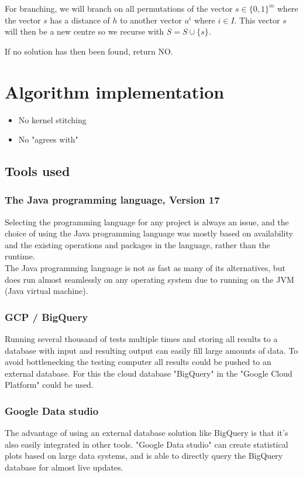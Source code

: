 \documentclass[a4paper]{article}
\begin{document}
For branching, we will branch on all permutations of the vector $s \in \{0,1\}^m$ where the vector $s$ has a
distance of $h$ to another vector $a^i$ where $i \in I$. This vector $s$ will then be a new centre so we recurse
with $S = S \cup \{s\}$.

If no solution has then been found, return NO.



%
%
\newpage

\section{Algorithm implementation}
\begin{itemize}
    \item No kernel stitching
    \item No "agrees with"
\end{itemize}
\subsection{Tools used}
\subsubsection{The Java programming language, Version 17}
Selecting the programming language for any project is always an issue, and the choice of using
the Java programming language was mostly based on availability and the existing operations
and packages in the language, rather than the runtime.
\\
The Java programming language is not as fast as many of its alternatives, but does run almost
seamlessly on any operating system due to running on the JVM (Java virtual machine).

\subsubsection{GCP / BigQuery}
\label{sec:bigquery}
Running several thousand of tests multiple times and storing all results to a database with
input and resulting output can easily fill large amounts of data. To avoid bottlenecking the
testing computer all results could be pushed to an external database. For this the cloud database
"BigQuery" in the "Google Cloud Platform" could be used.

\subsubsection{Google Data studio}
\label{sec:datastudio}
The advantage of using an external database solution like BigQuery is that it's also easily
integrated in other tools. "Google Data studio" can create statistical plots based on large
data systems, and is able to directly query the BigQuery database for almost live updates.
\end{document}
